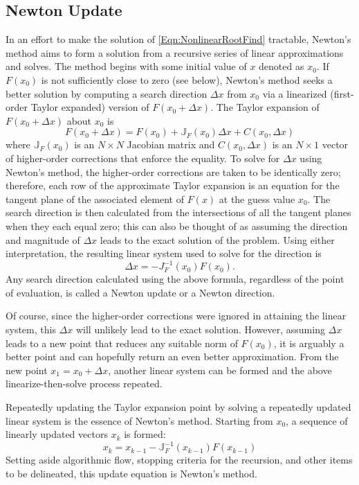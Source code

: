 \documentclass[Prelim,12pt]{WisconsinThesis}
\newcommand{\by}    {\!\times\!}
\begin{document}
\subsection{Newton Update}
In an effort to make the solution of \cref{Eqn:NonlinearRootFind} tractable, Newton's method aims to form a solution from a recursive series of linear approximations and solves.
The method begins with some initial value of $x$ denoted as $x_0$.
If $F(x_0)$ is not sufficiently close to zero (see below), Newton's method seeks a better solution by computing a search direction $\Delta{x}$ from $x_0$ via a linearized (first-order Taylor expanded) version of $F(x_0 + \Delta{x})$.
The Taylor expansion of $F(x_0 + \Delta{x})$ about $x_0$ is
\begin{equation}
    F(x_0 + \Delta{x}) =  F(x_0) + \mathbb{J}_{F}(x_0)\Delta{x} + C(x_0,\Delta{x})
\end{equation}
where $\mathbb{J}_{F}(x_0)$ is an $N \by N$ Jacobian matrix and $C(x_0,\Delta{x})$ is an $N \by 1$ vector of higher-order corrections that enforce the equality.
To solve for $\Delta{x}$ using Newton's method, the higher-order corrections are taken to be identically zero; therefore, each row of the approximate Taylor expansion is an equation for the tangent plane of the associated element of $F(x)$ at the guess value $x_0$.
The search direction is then calculated from the intersections of all the tangent planes when they each equal zero; this can also be thought of as assuming the direction and magnitude of $\Delta{x}$ leads to the exact solution of the problem.
Using either interpretation, the resulting linear system used to solve for the direction is
\begin{equation}
    \Delta{x} = - J_{F}^{-1}(x_0) F(x_0).
\end{equation}
Any search direction calculated using the above formula, regardless of the point of evaluation, is called a Newton update or a Newton direction.

Of course, since the higher-order corrections were ignored in attaining the linear system, this $\Delta{x}$ will unlikely lead to the exact solution.
However, assuming $\Delta{x}$ leads to a new point that reduces any suitable norm of $F(x_0)$, it is arguably a better point and can hopefully return an even better approximation.
From the new point $x_1 = x_0 + \Delta{x}$, another linear system can be formed and the above linearize-then-solve process repeated.

Repeatedly updating the Taylor expansion point by solving a repeatedly updated linear system is the essence of Newton's method.
Starting from $x_0$, a sequence of linearly updated vectors $x_k$ is formed:
\begin{equation}
    x_k = x_{k-1} - \mathbb{J}_{F}^{-1}(x_{k-1}) F(x_{k-1})
\end{equation}
Setting aside algorithmic flow, stopping criteria for the recursion, and other items to be delineated, this update equation is Newton's method.
\end{document}
